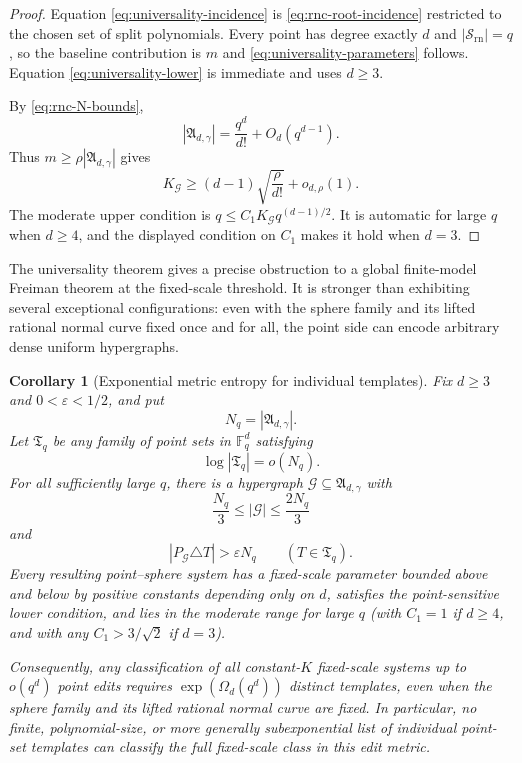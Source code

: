 \documentclass[11pt,letterpaper]{amsart}
\newtheorem{corollary}[corollary]{Corollary}
\theoremstyle{definition}
\theoremstyle{remark}
\newcommand{\1}{\mathbf 1}
\begin{document}
\begin{proof}
Equation \eqref{eq:universality-incidence} is \eqref{eq:rnc-root-incidence} restricted to the chosen set of split polynomials.  Every point has degree exactly $d$ and $|\mathcal S_{\mathrm{rn}}|=q$, so the baseline contribution is $m$ and \eqref{eq:universality-parameters} follows.  Equation \eqref{eq:universality-lower} is immediate and uses $d\ge3$.

By \eqref{eq:rnc-N-bounds},
\[
 |\mathfrak A_{d,\gamma}|=\frac{q^d}{d!}+O_d(q^{d-1}).
\]
Thus $m\ge\rho|\mathfrak A_{d,\gamma}|$ gives
\[
 K_{\mathcal G}\ge(d-1)\sqrt{\frac\rho{d!}}+o_{d,\rho}(1).
\]
The moderate upper condition is $q\le C_1K_{\mathcal G}q^{(d-1)/2}$.  It is automatic for large $q$ when $d\ge4$, and the displayed condition on $C_1$ makes it hold when $d=3$.
\end{proof}

The universality theorem gives a precise obstruction to a global finite-model Freiman theorem at the fixed-scale threshold.  It is stronger than exhibiting several exceptional configurations: even with the sphere family and its lifted rational normal curve fixed once and for all, the point side can encode arbitrary dense uniform hypergraphs.

\begin{corollary}[Exponential metric entropy for individual templates]\label{cor:no-freiman-list}
Fix $d\ge3$ and $0<\varepsilon<1/2$, and put
\[
 N_q=|\mathfrak A_{d,\gamma}|.
\]
Let $\mathfrak T_q$ be any family of point sets in $\mathbb F_q^d$ satisfying
\[
 \log|\mathfrak T_q|=o(N_q).
\]
For all sufficiently large $q$, there is a hypergraph $\mathcal G\subseteq\mathfrak A_{d,\gamma}$ with
\begin{equation}\label{eq:middle-hypergraph}
 \frac{N_q}{3}\le|\mathcal G|\le\frac{2N_q}{3}
\end{equation}
and
\begin{equation}\label{eq:no-template-close}
 |P_{\mathcal G}\triangle T|>\varepsilon N_q
 \qquad(T\in\mathfrak T_q).
\end{equation}
Every resulting point--sphere system has a fixed-scale parameter bounded above and below by positive constants depending only on $d$, satisfies the point-sensitive lower condition, and lies in the moderate range for large $q$ (with $C_1=1$ if $d\ge4$, and with any $C_1>3/\sqrt2$ if $d=3$).

Consequently, any classification of all constant-$K$ fixed-scale systems up to $o(q^d)$ point edits requires $\exp(\Omega_d(q^d))$ distinct templates, even when the sphere family and its lifted rational normal curve are fixed.  In particular, no finite, polynomial-size, or more generally subexponential list of individual point-set templates can classify the full fixed-scale class in this edit metric.
\end{corollary}
\end{document}
